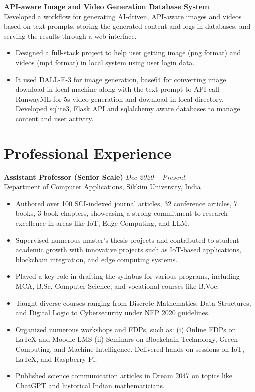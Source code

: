 \documentclass[10pt,a4paper]{article}
\begin{document}
	\textbf{API-aware Image and Video Generation Database System} \hfill \textit{}\\
	Developed a workflow for generating AI-driven, API-aware images and videos based on text prompts, storing the generated content and logs in databases, and serving the results through a web interface.
	\begin{itemize}[leftmargin=0.2in]
		\item Designed a full-stack project to help user getting image (png format) and videos (mp4 format) in local system using user login data.
		\item It used DALL-E-3 for image generation, base64 for converting image download in local machine along with the text prompt to API call RunwayML for 5s video generation and download in local directory. Developed sqlite3, Flask API and sqlalchemy aware databases to manage content and user activity. 
		
	\end{itemize}
	
	\section*{Professional Experience}
	
	\textbf{Assistant Professor (Senior Scale)} \hfill \textit{Dec 2020 -- Present}\\
	Department of Computer Applications, Sikkim University, India
	\begin{itemize}[leftmargin=0.2in]
		\item Authored over 100 SCI-indexed journal articles, 32 conference articles, 7 books, 3 book chapters, showcasing a strong commitment to research excellence in areas like IoT, Edge Computing, and LLM.
		\item Supervised numerous master’s thesis projects and contributed to student academic growth with innovative projects such as IoT-based applications, blockchain integration, and edge computing systems.
		\item Played a key role in drafting the syllabus for various programs, including MCA, B.Sc. Computer Science, and vocational courses like B.Voc.
		\item Taught diverse courses ranging from Discrete Mathematics, Data Structures, and Digital Logic to Cybersecurity under NEP 2020 guidelines.
		\item Organized numerous workshops and FDPs, such as: (i) Online FDPs on LaTeX and Moodle LMS (ii) Seminars on Blockchain Technology, Green Computing, and Machine Intelligence.
		Delivered hands-on sessions on IoT, LaTeX, and Raspberry Pi.
		\item Published science communication articles in Dream 2047 on topics like ChatGPT and historical Indian mathematicians.
	\end{itemize}
	
\end{document}
